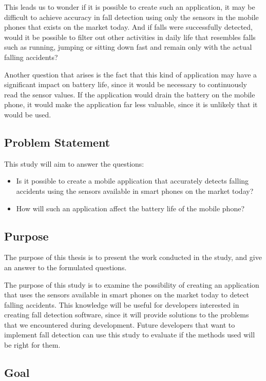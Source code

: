 \documentclass[12pt, a4paper, onecolumn]{article}
\begin{document}
	This leads us to wonder if it is possible to create such an application, it may be difficult to achieve accuracy in fall detection using only the sensors in the mobile phones that exists on the market today. And if falls were successfully detected, would it be possible to filter out other activities in daily life that resembles falls such as running, jumping or sitting down fast and remain only with the actual falling accidents?
	
	Another question that arises is the fact that this kind of application may have a significant impact on battery life, since it would be necessary to continuously read the sensor values. If the application would drain the battery on the mobile phone, it would make the application far less valuable, since it is unlikely that it would be used.
	
	\subsection{Problem Statement}
	
	This study will aim to answer the questions:
	
	\begin{itemize}
		\item Is it possible to create a mobile application that accurately detects falling accidents using the sensors available in smart phones on the market today?
		\item How will such an application affect the battery life of the mobile phone?
	\end{itemize}
	
	\subsection{Purpose}
	
	The purpose of this thesis is to present the work conducted in the study, and give an answer to the formulated questions.
	
	The purpose of this study is to examine the possibility of creating an application that uses the sensors available in smart phones on the market today to detect falling accidents. This knowledge will be useful for developers interested in creating fall detection software, since it will provide solutions to the problems that we encountered during development. Future developers that want to implement fall detection can use this study to evaluate if the methods used will be right for them.
	
	\subsection{Goal}
	
\end{document}
